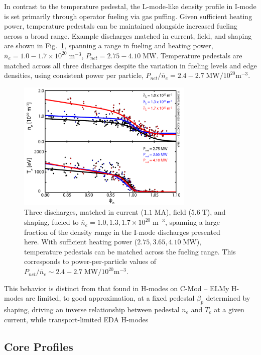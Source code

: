 \documentclass[12pt]{iopart}
\begin{document}
In contrast to the temperature pedestal, the L-mode-like density profile in I-mode is set primarily through operator fueling via gas puffing.
Given sufficient heating power, temperature pedestals can be maintained alongside increased fueling across a broad range.
Example discharges matched in current, field, and shaping are shown in Fig.~\ref{fig:fuelingprofiles}, spanning a range in fueling and heating power, $\overline{n}_e = 1.0-1.7\times10^{20} \;\mbox{m}^{-3}$, $P_{net} = 2.75-4.10\;\mbox{MW}$.  
Temperature pedestals are matched across all three discharges despite the variation in fueling levels and edge densities, using consistent power per particle, $P_{net}/\overline{n}_e = 2.4-2.7\;\mbox{MW}/10^{20}\mbox{m}^{-3}$.

\begin{figure}[ht]
 \centering
 \includegraphics[width=0.75\textwidth]{fuelingprofiles.pdf}
 \caption{Three discharges, matched in current ($1.1\;\mbox{MA}$), field ($5.6\;\mbox{T}$), and shaping, fueled to $\overline{n}_e = 1.0, 1.3, 1.7 \times 10^{20} \;\mbox{m}^{-3}$, spanning a large fraction of the density range in the I-mode discharges presented here.  With sufficient heating power ($2.75, 3.65, 4.10 \;\mbox{MW}$), temperature pedestals can be matched across the fueling range.  This corresponds to power-per-particle values of $P_{net}/\overline{n}_e \sim 2.4-2.7 \;\mbox{MW}/10^{20}\mbox{m}^{-3}$.}
 \label{fig:fuelingprofiles}
\end{figure}

This behavior is distinct from that found in H-modes on C-Mod -- ELMy H-modes are limited, to good approximation, at a fixed pedestal $\beta_p$ determined by shaping, driving an inverse relationship between pedestal $n_e$ and $T_e$ at a given current, while transport-limited EDA H-modes 

\subsection{Core Profiles}\label{subsec:core}
\end{document}
